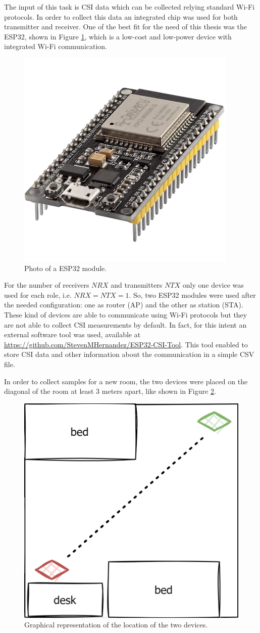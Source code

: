 \documentclass[binding=0.6cm,noexaminfo]{sapthesis}
\begin{document}
The input of this task is CSI data which can be collected relying standard Wi-Fi protocols. In order to collect this data an integrated chip was used for both transmitter and receiver. One of the best fit for the need of this thesis was the ESP32, shown in Figure \ref{fig:esp32}, which is a low-cost and low-power device with integrated Wi-Fi communication.

\begin{figure}[h!]
\centering
\includegraphics[width=.25\linewidth]{esp32}
\caption{Photo of a ESP32 module.}
\label{fig:esp32}
\end{figure}

For the number of receivers $NRX$ and transmitters $NTX$ only one device was used for each role, i.e. $NRX = NTX = 1$. So, two ESP32 modules were used after the needed configuration: one as router (AP) and the other as station (STA). These kind of devices are able to communicate using Wi-Fi protocols but they are not able to collect CSI measurements by default.
In fact, for this intent an external software tool was used, available at \url{https://github.com/StevenMHernandez/ESP32-CSI-Tool}. This tool enabled to store CSI data and other information about the communication in a simple CSV file.

In order to collect samples for a new room, the two devices were placed on the diagonal of the room at least 3 meters apart, like shown in Figure \ref{fig:devices-location}.

\begin{figure}[h!]
\centering
\includegraphics[width=.4\linewidth]{devices-location}
\caption{Graphical representation of the location of the two devices.}
\label{fig:devices-location}
\end{figure}
\end{document}
